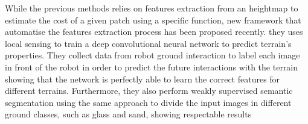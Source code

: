 \documentclass[../document.tex]{subfiles}
\begin{document}
While the previous methods relies on features extraction from an heightmap to estimate the cost of a given patch using a specific function, new framework that automatise the features extraction process has been proposed recently. \cite{wellhausen2019where} they uses local sensing to train a deep convolutional neural network to predict terrain's properties. They collect data from robot ground interaction to label each image in front of the robot in order to predict the future interactions with the terrain showing that the network is perfectly able to learn the correct features for different terrains.
Furthermore, they also perform weakly supervised semantic segmentation using the same approach to divide the input images in different ground classes, such as glass and sand, showing respectable results 
\end{document}
